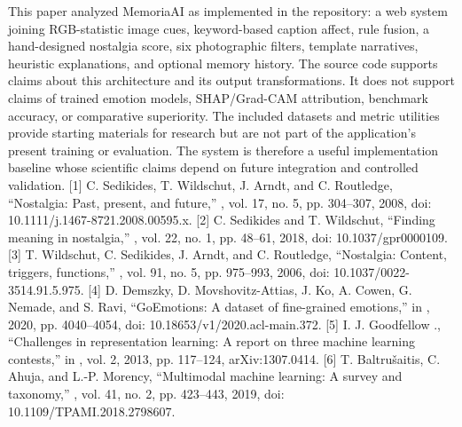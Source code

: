 \documentclass[conference]{IEEEtran}
\begin{document}
{}
\markdownRendererSectionEnd \markdownRendererSectionBegin
{}\markdownRendererInterblockSeparator
{}This paper analyzed MemoriaAI as implemented in the repository: a web system joining RGB-statistic image cues, keyword-based caption affect, rule fusion, a hand-designed nostalgia score, six photographic filters, template narratives, heuristic explanations, and optional memory history. The source code supports claims about this architecture and its output transformations. It does not support claims of trained emotion models, SHAP/Grad-CAM attribution, benchmark accuracy, or comparative superiority. The included datasets and metric utilities provide starting materials for research but are not part of the application’s present training or evaluation. The system is therefore a useful implementation baseline whose scientific claims depend on future integration and controlled validation.\markdownRendererInterblockSeparator
{}
\markdownRendererSectionEnd \markdownRendererSectionBegin
{}\markdownRendererInterblockSeparator
{}[1] C. Sedikides, T. Wildschut, J. Arndt, and C. Routledge, “Nostalgia: Past, present, and future,” , vol. 17, no. 5, pp. 304–307, 2008, doi: 10.1111/j.1467-8721.2008.00595.x.\markdownRendererParagraphSeparator
{}[2] C. Sedikides and T. Wildschut, “Finding meaning in nostalgia,” , vol. 22, no. 1, pp. 48–61, 2018, doi: 10.1037/gpr0000109.\markdownRendererParagraphSeparator
{}[3] T. Wildschut, C. Sedikides, J. Arndt, and C. Routledge, “Nostalgia: Content, triggers, functions,” , vol. 91, no. 5, pp. 975–993, 2006, doi: 10.1037/0022-3514.91.5.975.\markdownRendererParagraphSeparator
{}[4] D. Demszky, D. Movshovitz-Attias, J. Ko, A. Cowen, G. Nemade, and S. Ravi, “GoEmotions: A dataset of fine-grained emotions,” in , 2020, pp. 4040–4054, doi: 10.18653/v1/2020.acl-main.372.\markdownRendererParagraphSeparator
{}[5] I. J. Goodfellow ., “Challenges in representation learning: A report on three machine learning contests,” in , vol. 2, 2013, pp. 117–124, arXiv:1307.0414.\markdownRendererParagraphSeparator
{}[6] T. Baltrušaitis, C. Ahuja, and L.-P. Morency, “Multimodal machine learning: A survey and taxonomy,” , vol. 41, no. 2, pp. 423–443, 2019, doi: 10.1109/TPAMI.2018.2798607.\markdownRendererParagraphSeparator
\end{document}

